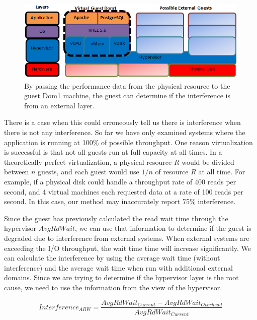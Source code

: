 \begin{figure}[!h]
  \begin{center}
  \includegraphics[width=6in]{images/LayersVirtualWithDisk.png}
  \caption{By passing the performance data from the physical resource to the guest Dom1 machine, the guest can determine if the interference is from an external layer.} 
  \label{LayersAndResourcesDisk}
  \end{center}
\end{figure}

There is a case when this could erroneously tell us there is interference when there is not any interference.  So far we have only examined systems where the application is running at 100\% of possible throughput.  One reason virtualization is successful is that not all guests run at full capacity at all times.  In a theoretically perfect virtualization, a physical resource $R$ would be divided between $n$ guests, and each guest would use $1/n$ of resource $R$ at all time.  For example, if a physical disk could handle a throughput rate of 400 reads per second, and 4 virtual machines each requested data at a rate of 100 reads per second. In this case, our method may inaccurately report 75\% interference.  

Since the guest has previously calculated the read wait time through the hypervisor $AvgRdWait$, we can use that information to determine if the guest is degraded due to interference from external systems.  When external systems are exceeding the I/O throughput, the wait time time will increase significantly.  We can calculate the interference by using the average wait time (without interference) and the average wait time when run with additional external domains.  Since we are trying to determine if the hypervisor layer is the root cause, we need to use the information from the view of the hypervisor.

\begin{equation}
	Interference_{ARW} = \frac{AvgRdWait_{Current} - AvgRdWait_{Overhead}}{AvgRdWait_{Current}} 
\end{equation}

